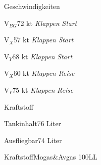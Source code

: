 \begin{memoryitem}
  \begin{checklist}{Geschwindigkeiten}
    \item{V$_{BG}$}{72 kt \textit{Klappen Start}}
    \item{V$_{X}$}{57 kt \textit{Klappen Start}}
    \item{V$_{Y}$}{68 kt \textit{Klappen Start}}
    \item{V$_{X}$}{60 kt \textit{Klappen Reise}}
    \item{V$_{Y}$}{75 kt \textit{Klappen Reise}}
  \end{checklist}
  \begin{checklist}{Kraftstoff}
    \item{Tankinhalt}{76 Liter}
    \item{Ausfliegbar}{74 Liter}
    \item{Kraftstoff}{Mogas\&Avgas 100LL}
  \end{checklist}
\end{memoryitem}

